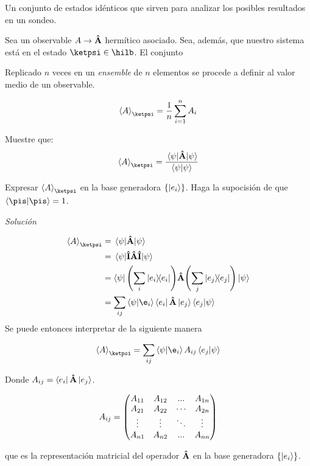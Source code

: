 \begin{definition}[Ensemble]
    Un conjunto de estados idénticos que sirven para analizar los posibles resultados en un sondeo.
\end{definition}

Sea un observable $A\rightarrow\vu{A}$ hermítico asociado. Sea, además, que nuestro sistema está en el estado $\ketpsi\in\hilb$. El conjunto


Replicado $n$ veces en un \textit{ensemble} de $n$ elementos se procede a definir al valor medio de un observable.

\begin{definition}
    $$
    \expval{A}_{\ketpsi}=\frac{1}{n}\sum_{i=1}^nA_i
    $$
\end{definition}

\begin{example}
      Muestre que:
      $$
        \expval{A}_{\ketpsi}=\frac{\expval{\vu{A}}{\psi}}{\braket{\psi}}
      $$
\end{example}

\begin{example}
      Expresar $\expval{A}_{\ketpsi}$ en la base generadora $\qty{\ket{e_i}}$. Haga la supocisión de que $\braket{\pis}=1$.
      
      \textit{Solución}
      
      \begin{align*}
          \expval{A}_{\ketpsi}&=\expval{\vu{A}}{\psi}\\
          &=\expval{\vu{I}\vu{A}\vu{I}}{\psi}\\
          &=\bra{\psi}\qty\Bigg(\sum_i\op{e_i})\vu{A}\qty\Bigg(\sum_j\op{e_j})\ket{\psi}\\
          &=\sum_{ij}\braket{\psi}{\e_i}\bra{e_i}\vu{A}\ket{e_j}\braket{e_j}{\psi}
      \end{align*}
     Se puede entonces interpretar de la siguiente manera
     
     $$
     \expval{A}_{\ketpsi}=\sum_{ij}\braket{\psi}{\e_i}A_{ij}\braket{e_j}{\psi}
     $$
     
     Donde $A_{ij}=\bra{e_i}\vu{A}\ket{e_j}$.
     
     $$
     A_{ij}=\mqty(A_{11}&A_{12}&...&A_{1n}\\A_{21}&A_{22}&\cdots&A_{2n}\\
     \vdots&\vdots&\ddots&\vdots\\A_{n1}&A_{n2}&...&A_{nn})
     $$
     
     que es la representación matricial del operador $\vu{A}$ en la base generadora $\qty{\ket{e_i}}$.
\end{example}

